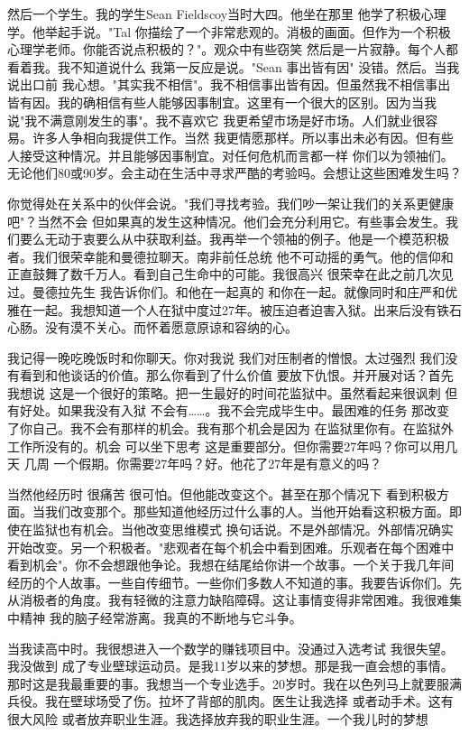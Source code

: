 然后一个学生。我的学生Sean Fieldscoy当时大四。他坐在那里 他学了积极心理学。他举起手说。"Tal 你描绘了一个非常悲观的。消极的画面。但作为一个积极心理学老师。你能否说点积极的？"。观众中有些窃笑 然后是一片寂静。每个人都看着我。我不知道说什么 我第一反应是说。"Sean 事出皆有因" 没错。然后。当我说出口前 我心想。"其实我不相信"。我不相信事出皆有因。但虽然我不相信事出皆有因。我的确相信有些人能够因事制宜。这里有一个很大的区别。因为当我说"我不满意刚发生的事"。我不喜欢它 我更希望市场是好市场。人们就业很容易。许多人争相向我提供工作。当然 我更情愿那样。所以事出未必有因。但有些人接受这种情况。并且能够因事制宜。对任何危机而言都一样 你们以为领袖们。无论他们80或90岁。会主动在生活中寻求严酷的考验吗。会想让这些困难发生吗？ 

你觉得处在关系中的伙伴会说。"我们寻找考验。我们吵一架让我们的关系更健康吧"？当然不会 但如果真的发生这种情况。他们会充分利用它。有些事会发生。我们要么无动于衷要么从中获取利益。我再举一个领袖的例子。他是一个模范积极者。我们很荣幸能和曼德拉聊天。南非前任总统 他不可动摇的勇气。他的信仰和正直鼓舞了数千万人。看到自己生命中的可能。我很高兴 很荣幸在此之前几次见过。曼德拉先生 我告诉你们。和他在一起真的 和你在一起。就像同时和庄严和优雅在一起。我想知道一个人在狱中度过27年。被压迫者迫害入狱。出来后没有铁石心肠。没有漠不关心。而怀着愿意原谅和容纳的心。 

我记得一晚吃晚饭时和你聊天。你对我说 我们对压制者的憎恨。太过强烈 我们没有看到和他谈话的价值。那么你看到了什么价值 要放下仇恨。并开展对话？首先我想说 这是一个很好的策略。把一生最好的时间花监狱中。虽然看起来很讽刺 但有好处。如果我没有入狱 不会有……。我不会完成毕生中。最困难的任务 那改变了你自己。我不会有那样的机会。我有那个机会是因为 在监狱里你有。在监狱外工作所没有的。机会 可以坐下思考 这是重要部分。但你需要27年吗？你可以用几天 几周 一个假期。你需要27年吗？好。他花了27年是有意义的吗？ 

当然他经历时 很痛苦 很可怕。但他能改变这个。甚至在那个情况下 看到积极方面。当我们改变那个。那些知道他经历过什么事的人。当他开始看这积极方面。即使在监狱也有机会。当他改变思维模式 换句话说。不是外部情况。外部情况确实开始改变。另一个积极者。"悲观者在每个机会中看到困难。乐观者在每个困难中看到机会"。你不会想跟他争论。我想在结尾给你讲一个故事。一个关于我几年间经历的个人故事。一些自传细节。一些你们多数人不知道的事。我要告诉你们。先从消极者的角度。我有轻微的注意力缺陷障碍。这让事情变得非常困难。我很难集中精神 我的脑子经常游离。我真的不断地与它斗争。 

当我读高中时。我很想进入一个数学的赚钱项目中。没通过入选考试 我很失望。我没做到 成了专业壁球运动员。是我11岁以来的梦想。那是我一直会想的事情。那时这是我最重要的事。我想当一个专业选手。20岁时。我在以色列马上就要服满兵役。我在壁球场受了伤。拉坏了背部的肌肉。医生让我选择 或者动手术。这有很大风险 或者放弃职业生涯。我选择放弃我的职业生涯。一个我儿时的梦想 

